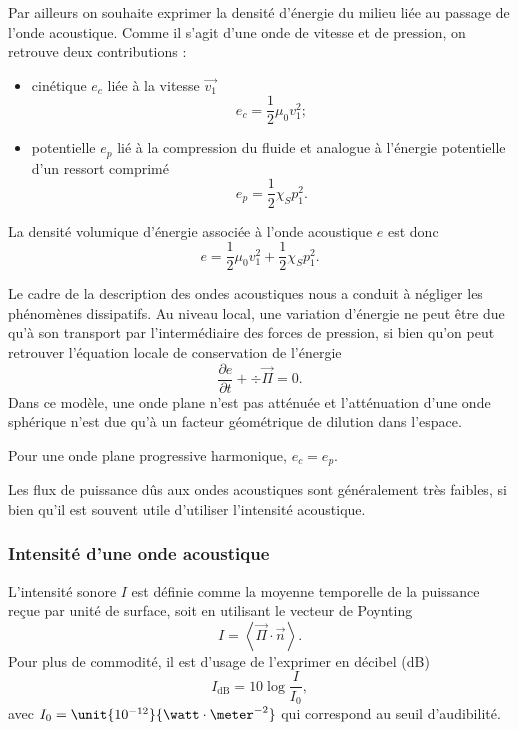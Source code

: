 Par ailleurs on souhaite exprimer la densité d'énergie du milieu liée au passage de l'onde acoustique.
Comme il s'agit d'une onde de vitesse et de pression, on retrouve deux contributions :
\begin{itemize}
\item cinétique $e_c$ liée à la vitesse $\overrightarrow{v_1}$
\begin{equation*}
e_c = \frac{1}{2}\mu_0 v_1^2 ;
\end{equation*}
\item potentielle $e_p$ lié à la compression du fluide et analogue à l'énergie potentielle d'un ressort comprimé
\begin{equation*}
e_p = \frac{1}{2} \chi_S p_1^2.
\end{equation*}
\end{itemize}
La densité volumique d'énergie associée à l'onde acoustique $e$ est donc
\begin{equation}
e = \frac{1}{2}\mu_0v_1^2 + \frac{1}{2}\chi_S p_1^2.
\end{equation}

Le cadre de la description des ondes acoustiques nous a conduit à négliger les phénomènes dissipatifs.
Au niveau local, une variation d'énergie ne peut être due qu'à son transport par l'intermédiaire des forces de pression, si bien qu'on peut retrouver l'équation locale de conservation de l'énergie
\begin{equation}
\frac{\partial e}{\partial t} + \div\overrightarrow{\Pi} = 0.
\end{equation}
Dans ce modèle, une onde plane n'est pas atténuée et l'atténuation d'une onde sphérique n'est due qu'à un facteur géométrique de dilution dans l'espace.
\begin{remarque}
Pour une onde plane progressive harmonique, $e_c = e_p$.
\end{remarque}

\begin{transition}
Les flux de puissance dûs aux ondes acoustiques sont généralement très faibles, si bien qu'il est souvent utile d'utiliser l'intensité acoustique. 
\end{transition}

\subsubsection{Intensité d'une onde acoustique}

L'intensité sonore $I$ est définie comme la moyenne temporelle de la puissance reçue par unité de surface, soit en utilisant le vecteur de Poynting
\begin{equation*}
I = \left\langle \overrightarrow{\Pi}\cdot\overrightarrow{n} \right\rangle.
\end{equation*}
Pour plus de commodité, il est d'usage de l'exprimer en décibel (dB)
\begin{equation}
I_\mathrm{dB} = 10\log\frac{I}{I_0},
\end{equation}
avec $I_0 = \unit{10^{-12}}{\watt\cdot\meter^{-2}}$ qui correspond au seuil d'audibilité.

